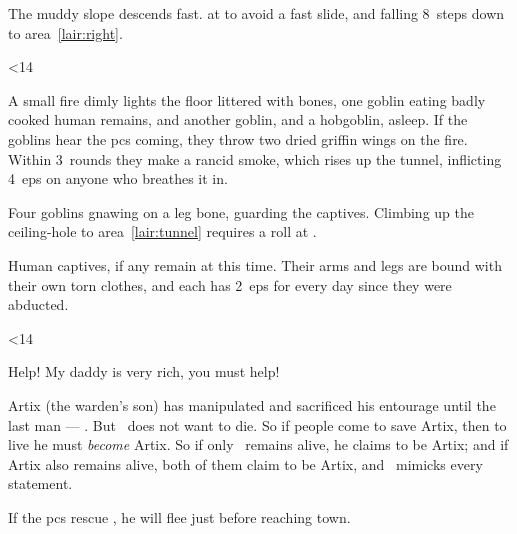 \documentclass[10pt,twoside]{book}
\begin{document}
The muddy slope descends fast.
 at \tn[8] to avoid a fast slide, and falling 8~\glspl{step} down to \gls{area}~\ref{lair:right}.%

\ifnum\thepage<14
\fi


A small fire dimly lights the floor littered with bones, one goblin eating badly cooked human remains, and another goblin, and a hobgoblin, asleep.
If the goblins hear the \glspl{pc} coming, they throw two dried \gls{griffin} wings on the fire.
Within 3~\glspl{round} they make a rancid smoke, which rises up the tunnel, inflicting 4~\glspl{ep} on anyone who breathes it in.%

Four goblins gnawing on a leg bone, guarding the captives.
Climbing up the ceiling-hole to \gls{area}~\ref{lair:tunnel} requires a  roll at \tn[12].


Human captives, if any remain at this time.
Their arms and legs are bound with their own torn clothes, and each has 2~\glspl{ep} for every day since they were abducted.

\ifnum\thepage<14
  \begin{speechtext}
    Help!
    My daddy is very rich, you must help!
  \end{speechtext}
\fi

Artix (the \gls{warden}'s son) has manipulated and sacrificed his entourage until the last man --- \composeHumanName.
But \currentName\ does not want to die.
So if people come to save Artix, then to live he must \emph{become} Artix.
So if only \currentName\ remains alive, he claims to be Artix; and if Artix also remains alive, both of them claim to be Artix, and \currentName\ mimicks every statement.

If the \glspl{pc} rescue \currentName, he will flee just before reaching town.
\end{document}
